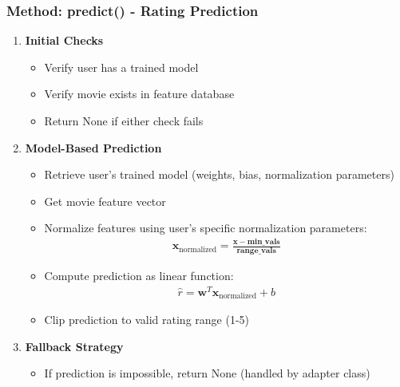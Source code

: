 \documentclass{beamer}
\begin{document}
\begin{frame}
\frametitle{Method: predict() - Rating Prediction}

\begin{enumerate}
    \item \textbf{Initial Checks}
    \begin{itemize}
        \item Verify user has a trained model
        \item Verify movie exists in feature database
        \item Return None if either check fails
    \end{itemize}
    
    \item \textbf{Model-Based Prediction}
    \begin{itemize}
        \item Retrieve user's trained model (weights, bias, normalization parameters)
        \item Get movie feature vector
        \item Normalize features using user's specific normalization parameters:
        \begin{align*}
        \mathbf{x}_{\text{normalized}} = \frac{\mathbf{x} - \mathbf{min\_vals}}{\mathbf{range\_vals}}
        \end{align*}
        \item Compute prediction as linear function:
        \begin{align*}
        \hat{r} = \mathbf{w}^T \mathbf{x}_{\text{normalized}} + b
        \end{align*}
        \item Clip prediction to valid rating range (1-5)
    \end{itemize}
    
    \item \textbf{Fallback Strategy}
    \begin{itemize}
        \item If prediction is impossible, return None (handled by adapter class)
    \end{itemize}
\end{enumerate}
\end{frame}
\end{document}
